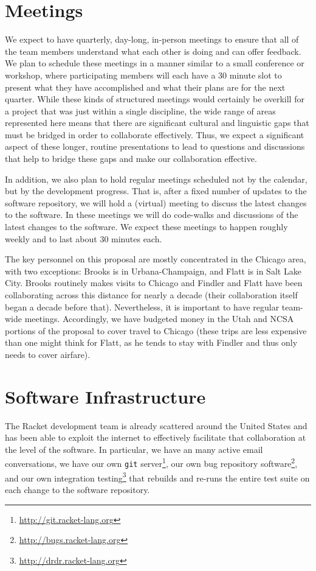 \section{Meetings}

We expect to have quarterly, day-long, in-person meetings to ensure
that all of the team members understand what each other is doing and
can offer feedback. We plan to schedule these meetings in a manner
similar to a small conference or workshop, where participating members
will each have a 30 minute slot to present what they have accomplished
and what their plans are for the next quarter. While these kinds of
structured meetings would certainly be overkill for a project that was
just within a single discipline, the wide range of areas represented
here means that there are significant cultural and linguistic gaps
that must be bridged in order to collaborate effectively. Thus, we
expect a significant aspect of these longer, routine presentations to
lead to questions and discussions that help to bridge these gaps and make our
collaboration effective.

In addition, we also plan to hold regular meetings scheduled not by
the calendar, but by the development progress. That is, after a fixed
number of updates to the software repository, we will hold a
(virtual) meeting to discuss the latest changes to the software. In
these meetings we will do code-walks and discussions of the latest
changes to the software. We expect these meetings to happen roughly
weekly and to last about 30 minutes each.

The key personnel on this proposal are mostly concentrated in the
Chicago area, with two exceptions: Brooks is in Urbana-Champaign, and
Flatt is in Salt Lake City. Brooks routinely makes visits to Chicago
and Findler and Flatt have been collaborating across this distance for
nearly a decade (their collaboration itself began a decade before
that). Nevertheless, it is important to have regular team-wide
meetings. Accordingly, we have budgeted money in the Utah and NCSA
portions of the proposal to cover travel to Chicago (these trips are
less expensive than one might think for Flatt, as he tends to stay
with Findler and thus only needs to cover airfare).

\section{Software Infrastructure}

The Racket development team is already scattered around the United
States and has been able to exploit the internet to effectively
facilitate that collaboration at the level of the software.  In
particular, we have an many active email conversations, we have our
own \texttt{git} server\footnote{\url{http://git.racket-lang.org}}, our own
bug repository software\footnote{\url{http://bugs.racket-lang.org}}, and our
own integration testing\footnote{\url{http://drdr.racket-lang.org}} that
rebuilds and re-runs the entire test suite on each change to the
software repository.

